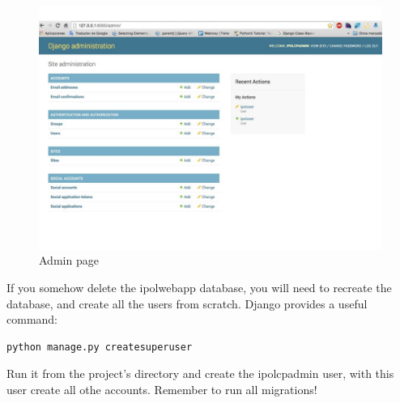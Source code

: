 \begin{figure}[!ht]
\centering
\includegraphics[width=0.5\columnwidth]{images/admin}
\caption{Admin page} 
\label{fi:admin_page}
\end{figure}


If you somehow delete the ipolwebapp database, you will need to recreate the database, and create all the users from scratch. Django provides a useful command: 

\begin{lstlisting}[language=Python,firstnumber=1]
python manage.py createsuperuser
\end{lstlisting}

Run it from the project's directory and create the ipolcpadmin user, 
with this user create all othe accounts.
Remember to run all migrations!




